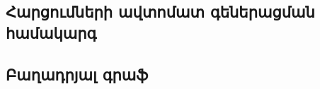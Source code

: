 {
	\subsection{Հարցումների ավտոմատ գեներացման համակարգ}\label{subsec:queryAggregation}
	

	\subsection{Բաղադրյալ գրաֆ}\label{subsec:proceduregraph}
	
}
